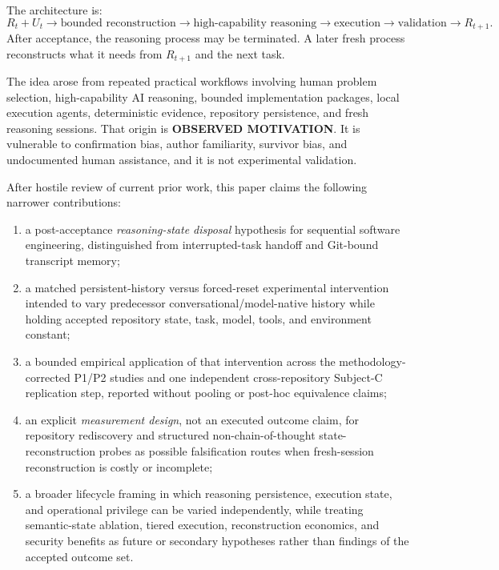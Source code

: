 The architecture is:
\[
R_t + U_t
\rightarrow
\text{bounded reconstruction}
\rightarrow
\text{high-capability reasoning}
\rightarrow
\text{execution}
\rightarrow
\text{validation}
\rightarrow
R_{t+1}.
\]
After acceptance, the reasoning process may be terminated. A later fresh process reconstructs what it needs from $R_{t+1}$ and the next task.

The idea arose from repeated practical workflows involving human problem selection, high-capability AI reasoning, bounded implementation packages, local execution agents, deterministic evidence, repository persistence, and fresh reasoning sessions. That origin is \textbf{OBSERVED MOTIVATION}. It is vulnerable to confirmation bias, author familiarity, survivor bias, and undocumented human assistance, and it is not experimental validation.

After hostile review of current prior work, this paper claims the following narrower contributions:

\begin{enumerate}
    \item a post-acceptance \emph{reasoning-state disposal} hypothesis for sequential software engineering, distinguished from interrupted-task handoff and Git-bound transcript memory;
    \item a matched persistent-history versus forced-reset experimental intervention intended to vary predecessor conversational/model-native history while holding accepted repository state, task, model, tools, and environment constant;
    \item a bounded empirical application of that intervention across the methodology-corrected P1/P2 studies and one independent cross-repository Subject-C replication step, reported without pooling or post-hoc equivalence claims;
    \item an explicit \emph{measurement design}, not an executed outcome claim, for repository rediscovery and structured non-chain-of-thought state-reconstruction probes as possible falsification routes when fresh-session reconstruction is costly or incomplete;
    \item a broader lifecycle framing in which reasoning persistence, execution state, and operational privilege can be varied independently, while treating semantic-state ablation, tiered execution, reconstruction economics, and security benefits as future or secondary hypotheses rather than findings of the accepted outcome set.
\end{enumerate}


